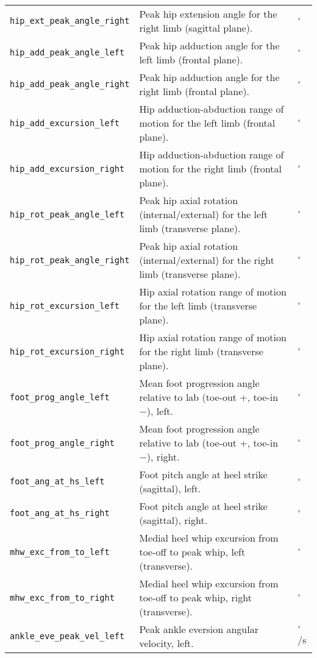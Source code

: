 \begin{longtable}{@{}l p{} l@{}}
    \texttt{hip\_ext\_peak\_angle\_right} & Peak hip extension angle for the right limb (sagittal plane). & $^\circ$ \\
    \texttt{hip\_add\_peak\_angle\_left} & Peak hip adduction angle for the left limb (frontal plane). & $^\circ$ \\
    \texttt{hip\_add\_peak\_angle\_right} & Peak hip adduction angle for the right limb (frontal plane). & $^\circ$ \\
    \texttt{hip\_add\_excursion\_left} & Hip adduction-abduction range of motion for the left limb (frontal plane). & $^\circ$ \\
    \texttt{hip\_add\_excursion\_right} & Hip adduction-abduction range of motion for the right limb (frontal plane). & $^\circ$ \\
    \texttt{hip\_rot\_peak\_angle\_left} & Peak hip axial rotation (internal/external) for the left limb (transverse plane). & $^\circ$ \\
    \texttt{hip\_rot\_peak\_angle\_right} & Peak hip axial rotation (internal/external) for the right limb (transverse plane). & $^\circ$ \\
    \texttt{hip\_rot\_excursion\_left} & Hip axial rotation range of motion for the left limb (transverse plane). & $^\circ$ \\
    \texttt{hip\_rot\_excursion\_right} & Hip axial rotation range of motion for the right limb (transverse plane). & $^\circ$ \\
    \texttt{foot\_prog\_angle\_left} & Mean foot progression angle relative to lab (toe-out +, toe-in −), left. & $^\circ$ \\
    \texttt{foot\_prog\_angle\_right} & Mean foot progression angle relative to lab (toe-out +, toe-in −), right. & $^\circ$ \\
    \texttt{foot\_ang\_at\_hs\_left} & Foot pitch angle at heel strike (sagittal), left. & $^\circ$ \\
    \texttt{foot\_ang\_at\_hs\_right} & Foot pitch angle at heel strike (sagittal), right. & $^\circ$ \\
    \texttt{mhw\_exc\_from\_to\_left} & Medial heel whip excursion from toe-off to peak whip, left (transverse). & $^\circ$ \\
    \texttt{mhw\_exc\_from\_to\_right} & Medial heel whip excursion from toe-off to peak whip, right (transverse). & $^\circ$ \\
    \texttt{ankle\_eve\_peak\_vel\_left} & Peak ankle eversion angular velocity, left. & $^\circ$/s \\

\end{longtable}
